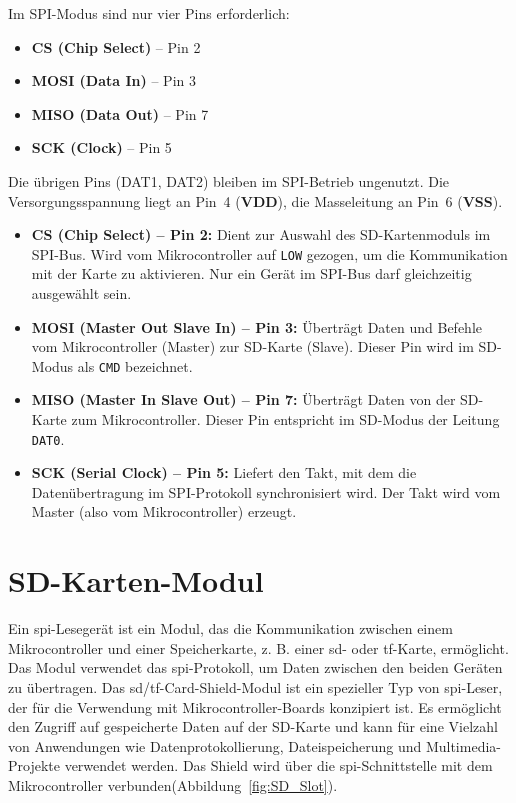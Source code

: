 Im SPI-Modus sind nur vier Pins erforderlich:

\begin{itemize}
    \item \textbf{CS (Chip Select)} – Pin 2
    \item \textbf{MOSI (Data In)} – Pin 3
    \item \textbf{MISO (Data Out)} – Pin 7
    \item \textbf{SCK (Clock)} – Pin 5
\end{itemize}

Die übrigen Pins (DAT1, DAT2) bleiben im SPI-Betrieb ungenutzt. Die Versorgungsspannung liegt an Pin~4 (\textbf{VDD}), die Masseleitung an Pin~6 (\textbf{VSS}).


\begin{itemize}
    \item \textbf{CS (Chip Select) – Pin 2:}  
    Dient zur Auswahl des SD-Kartenmoduls im SPI-Bus. Wird vom Mikrocontroller auf \texttt{LOW} gezogen, um die Kommunikation mit der Karte zu aktivieren. Nur ein Gerät im SPI-Bus darf gleichzeitig ausgewählt sein.
    
    \item \textbf{MOSI (Master Out Slave In) – Pin 3:}  
    Überträgt Daten und Befehle vom Mikrocontroller (Master) zur SD-Karte (Slave). Dieser Pin wird im SD-Modus als \texttt{CMD} bezeichnet.
    
    \item \textbf{MISO (Master In Slave Out) – Pin 7:}  
    Überträgt Daten von der SD-Karte zum Mikrocontroller. Dieser Pin entspricht im SD-Modus der Leitung \texttt{DAT0}.
    
    \item \textbf{SCK (Serial Clock) – Pin 5:}  
    Liefert den Takt, mit dem die Datenübertragung im SPI-Protokoll synchronisiert wird. Der Takt wird vom Master (also vom Mikrocontroller) erzeugt.
\end{itemize}


\chapter{SD-Karten-Modul}\label{SD-Karten-Modul}


Ein \ac{spi}-Lesegerät ist ein Modul, das die Kommunikation zwischen einem Mikrocontroller und einer Speicherkarte, z. B. einer \ac{sd}- oder \ac{tf}-Karte, ermöglicht. Das Modul verwendet das \ac{spi}-Protokoll, um Daten zwischen den beiden Geräten zu übertragen. Das \ac{sd}/\ac{tf}-Card-Shield-Modul ist ein spezieller Typ von \ac{spi}-Leser, der für die Verwendung mit Mikrocontroller-Boards konzipiert ist. Es ermöglicht den Zugriff auf gespeicherte Daten auf der SD-Karte und kann für eine Vielzahl von Anwendungen wie Datenprotokollierung, Dateispeicherung und Multimedia-Projekte verwendet werden. Das Shield wird über die \ac{spi}-Schnittstelle mit dem Mikrocontroller verbunden(Abbildung~\ref{fig:SD_Slot}).\cite{AZDelivery2025}

